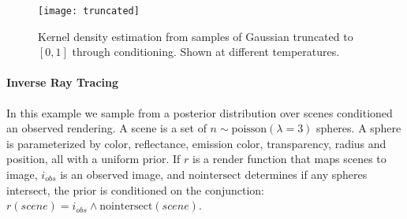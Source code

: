 \begin{figure}[!htb]
\centering
\texttt{[image: truncated]}

	
	
	\caption{Kernel density estimation from samples of Gaussian truncated to $[0, 1]$ through conditioning. Shown at different temperatures.}
	\label{fig:density}
\end{figure}



\paragraph{Inverse Ray Tracing}
In this example we sample from a posterior distribution over scenes conditioned an observed rendering.  A scene is a set of $n \sim \textrm{poisson}(\lambda = 3)$ spheres.
A sphere is parameterized by color, reflectance, emission color, transparency, radius and position, all with a uniform prior.
If $r$ is a render function that maps scenes to image, $i_{obs}$ is an observed image, and $\textrm{nointersect}$ determines if any spheres intersect, the prior is conditioned on the conjunction:
$r(scene) = i_{obs} \land \textrm{nointersect}(scene)$.

